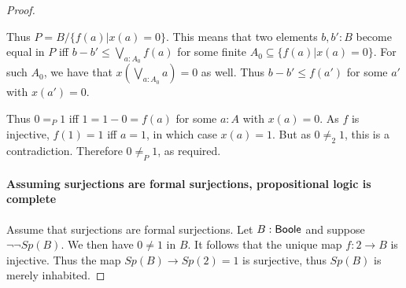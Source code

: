 \begin{proof}
\begin{itemize}
  \end{itemize} 
  Thus $P = B/\{f(a)|x(a)=0\}$. 
  This means that two elements $b,b':B$ become equal in $P$ iff 
  $b-b' \leq \bigvee_{a:A_0} f(a)$ for some finite $A_0 \subseteq \{f(a)| x(a) = 0\}$. 
  For such $A_0$, we have that $x(\bigvee_{a:A_0} a ) = 0$ as well. 
  Thus $b-b' \leq  f(a')$ for some $a'$ with $x(a') =0$. 

  Thus $0=_P 1$ iff $1 = 1 -0 = f(a)$ for some $a:A$ with $x(a) = 0$. 
  As $f$ is injective, $f(1) = 1$ iff $a=1$, in which case $x(a) = 1$. 
  But as $0\neq_2 1$, this is a contradiction. 
  Therefore $0\neq_P 1$, as required. 

\paragraph{Assuming surjections are formal surjections, propositional logic is complete}
  Assume that surjections are formal surjections. 
  Let $B:\mathsf{Boole}$ and suppose $\neg \neg Sp(B)$. 
  We then have $0\neq 1$ in $B$. 
  It follows that the unique map $f:2\to B$ is injective. 
  Thus the map $Sp(B) \to Sp(2) = 1$ is surjective, thus $Sp(B)$ is merely inhabited. 

\end{proof}
 


